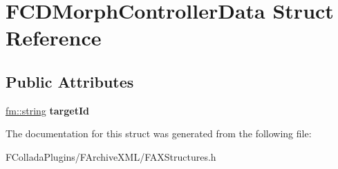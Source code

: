 \hypertarget{structFCDMorphControllerData}{
\section{FCDMorphControllerData Struct Reference}
\label{structFCDMorphControllerData}
}
\subsection*{Public Attributes}
\begin{DoxyCompactItemize}
\item 
\hypertarget{structFCDMorphControllerData_a178624878903024908ad4076488a8349}{
\hyperlink{classfm_1_1stringT}{fm::string} {\bfseries targetId}}
\label{structFCDMorphControllerData_a178624878903024908ad4076488a8349}

\end{DoxyCompactItemize}


The documentation for this struct was generated from the following file:\begin{DoxyCompactItemize}
\item 
FColladaPlugins/FArchiveXML/FAXStructures.h\end{DoxyCompactItemize}
